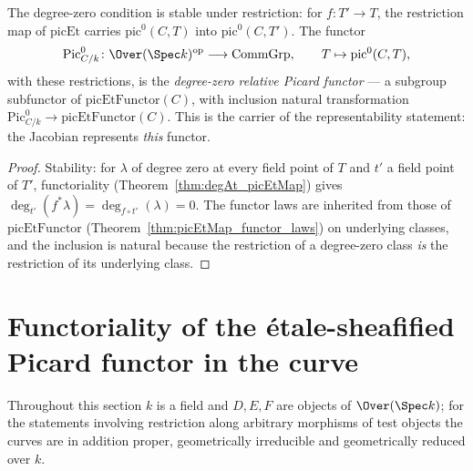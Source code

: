 \begin{definition}
  \label{def:pic0Functor}
  \leanok
  The degree-zero condition is stable under restriction: for \(f \colon T' \to T\), the
  restriction map of \(\mathrm{picEt}\) carries \(\mathrm{pic}^0(C,T)\) into
  \(\mathrm{pic}^0(C,T')\). The functor
  \[
    \mathrm{Pic}^0_{C/k} \colon \Over(\Spec k)^{\mathrm{op}} \longrightarrow \mathrm{CommGrp},
    \qquad T \mapsto \mathrm{pic}^0(C,T),
  \]
  with these restrictions, is the \emph{degree-zero relative Picard functor} — a subgroup
  subfunctor of \(\mathrm{picEtFunctor}(C)\), with inclusion natural transformation
  \(\mathrm{Pic}^0_{C/k} \to \mathrm{picEtFunctor}(C)\). This is the carrier of the
  representability statement: the Jacobian represents \emph{this} functor.
\end{definition}
\begin{proof}
  \leanok
  Stability: for \(\lambda\) of degree zero at every field point of \(T\) and \(t'\) a field
  point of \(T'\), functoriality (Theorem~\ref{thm:degAt_picEtMap}) gives
  \(\deg_{t'}(f^{*}\lambda) = \deg_{f \circ t'}(\lambda) = 0\). The functor laws are
  inherited from those of \(\mathrm{picEtFunctor}\)
  (Theorem~\ref{thm:picEtMap_functor_laws}) on underlying classes, and the inclusion is
  natural because the restriction of a degree-zero class \emph{is} the restriction of its
  underlying class.
\end{proof}

\section{Functoriality of the \'etale-sheafified Picard functor in the curve}

Throughout this section \(k\) is a field and \(D, E, F\) are objects of
\(\Over(\Spec k)\); for the statements involving restriction along arbitrary morphisms
of test objects the curves are in addition proper, geometrically irreducible and
geometrically reduced over \(k\).

